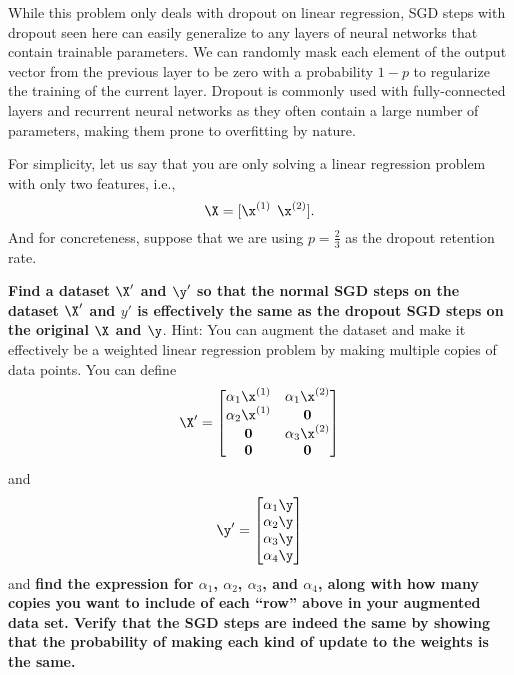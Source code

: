 \documentclass[preview]{standalone}
\begin{document}
While this problem only deals with dropout on linear regression, SGD
steps with dropout seen here can easily generalize to any layers of
neural networks that contain trainable parameters.  We can randomly
mask each element of the output vector from the previous layer to be
zero with a probability $1-p$ to regularize the training of the
current layer.  Dropout is commonly used with fully-connected layers
and recurrent neural networks as they often contain a large number of
parameters, making them prone to overfitting by nature.

\begin{Parts}
\Part For simplicity, let us say that you are only solving a linear regression problem with only two features, i.e.,
\begin{equation*}
    \X = [\x^{(1)} \:\:\x^{(2)}].
\end{equation*}
And for concreteness, suppose that we are using $p=\frac{2}{3}$ as the
dropout retention rate. 
 
\textbf{Find a dataset $\X'$ and $\y'$ so that the normal SGD steps on
 the dataset $\X'$ and $y'$ is effectively the same as the dropout SGD
 steps on the original $\X$ and $\y$}.  Hint: You can augment the dataset and make
it effectively be a weighted linear regression problem by making
multiple copies of data points.  You can define
\begin{equation}
    \X' = \begin{bmatrix}
        \alpha_1\x^{(1)} & \alpha_1\x^{(2)} \\
        \alpha_2\x^{(1)} & \mathbf{0} \\
        \mathbf{0} & \alpha_3\x^{(2)} \\
        \mathbf{0} & \mathbf{0}
    \end{bmatrix}
\end{equation}
and 
\begin{equation}
    \y' = \begin{bmatrix}
        \alpha_1\y \\
        \alpha_2\y \\
        \alpha_3\y \\
        \alpha_4\y \\
    \end{bmatrix}
\end{equation}
and \textbf{find the expression for $\alpha_1$, $\alpha_2$,
  $\alpha_3$, and $\alpha_4$, along with how many copies you want to
  include of each ``row'' above in your augmented data set. Verify
  that the SGD steps are indeed the same by showing that the
  probability of making each kind of update to the weights is the same.}




\end{Parts}
\end{document}
